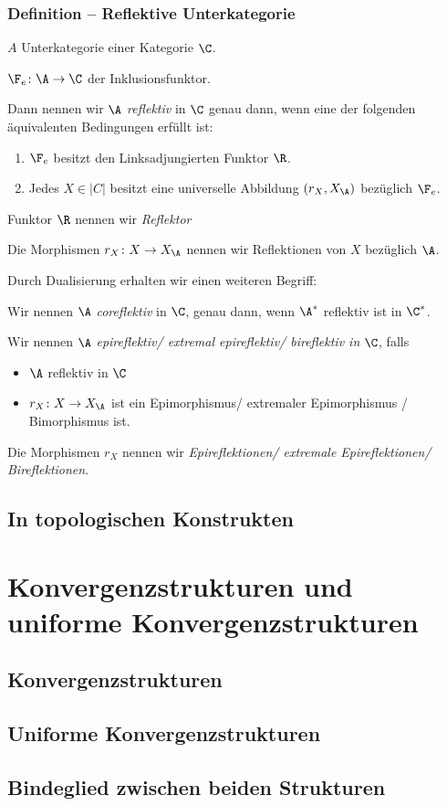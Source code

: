 \documentclass[serif,9pt]{beamer}
\begin{document}
\begin{frame}
  \frametitle{Definition -- Reflektive Unterkategorie}
  $A$ Unterkategorie einer Kategorie $\C$.
  
  $\F_e \colon \A \to \C$ der Inklusionsfunktor.

  Dann nennen wir $\A$ \emph{reflektiv} in $\C$ genau dann, wenn eine der folgenden äquivalenten Bedingungen erfüllt ist:
  \begin{enumerate}[(1)]
    \item $\F_e$ besitzt den Linksadjungierten Funktor $\R$.
    \item Jedes $X \in |C|$ besitzt eine universelle Abbildung $(r_X, X_\A)$ bezüglich $\F_e$.
  \end{enumerate}

  \pause
  \vspace{1em}
  Funktor $\R$ nennen wir \emph{Reflektor}
  
  Die Morphismen $r_X \colon X \to X_\A$ nennen wir Reflektionen von $X$ bezüglich $\A$.

  \pause
  \vspace{1em}
  Durch Dualisierung erhalten wir einen weiteren Begriff:

  Wir nennen $\A$ \emph{coreflektiv} in $\C$, genau dann, wenn $\A^*$ reflektiv ist in $\C^*$. 

  \pause
  \vspace{1em}

  Wir nennen $\A$ \emph{epireflektiv/ extremal epireflektiv/ bireflektiv in} $\C$, falls 
  \pause
  \begin{itemize}
    \item  $\A$ reflektiv in $\C$
    \item  $r_X \colon X \to X_\A$ ist ein Epimorphismus/ extremaler Epimorphismus / Bimorphismus ist.
  \end{itemize}
   
  Die Morphismen $r_X$ nennen wir \emph{Epireflektionen/ extremale Epireflektionen/ Bireflektionen}.
\end{frame}

\subsection{In topologischen Konstrukten}

\section{Konvergenzstrukturen und uniforme Konvergenzstrukturen}

\subsection{Konvergenzstrukturen}
\subsection{Uniforme Konvergenzstrukturen}
\subsection{Bindeglied zwischen beiden Strukturen}
\end{document}
